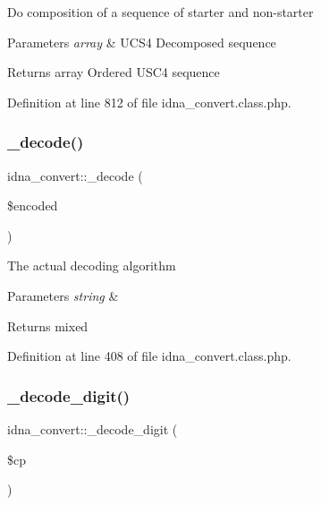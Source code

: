 Do composition of a sequence of starter and non-\/starter 
\begin{DoxyParams}{Parameters}
{\em array} & U\+C\+S4 Decomposed sequence \\
\hline
\end{DoxyParams}
\begin{DoxyReturn}{Returns}
array Ordered U\+S\+C4 sequence 
\end{DoxyReturn}


Definition at line 812 of file idna\+\_\+convert.\+class.\+php.

\mbox{\label{classidna__convert_a6e4c2f051cfd4ebd84d47c013c18205e}} 
\subsubsection{\texorpdfstring{\+\_\+decode()}{\_decode()}}
{\footnotesize\ttfamily idna\+\_\+convert\+::\+\_\+decode (\begin{DoxyParamCaption}\item[{}]{\$encoded }\end{DoxyParamCaption})\hspace{0.3cm}{\ttfamily [protected]}}

The actual decoding algorithm 
\begin{DoxyParams}{Parameters}
{\em string} & \\
\hline
\end{DoxyParams}
\begin{DoxyReturn}{Returns}
mixed 
\end{DoxyReturn}


Definition at line 408 of file idna\+\_\+convert.\+class.\+php.

\mbox{\label{classidna__convert_adb87b0a6d3168899e718dff394723e96}} 
\subsubsection{\texorpdfstring{\+\_\+decode\+\_\+digit()}{\_decode\_digit()}}
{\footnotesize\ttfamily idna\+\_\+convert\+::\+\_\+decode\+\_\+digit (\begin{DoxyParamCaption}\item[{}]{\$cp }\end{DoxyParamCaption})\hspace{0.3cm}{\ttfamily [protected]}}

